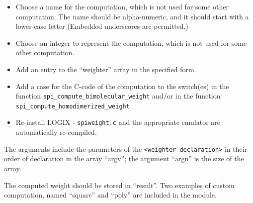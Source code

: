 \begin{itemize}
\item Choose a name for the computation, which is not used for some
other computation.  The name should be
alpha-numeric, and it should start with a lower-case letter (Embedded
underscores are permitted.)
\item Choose an integer to represent the computation, which is not used for
some other computation.
\item Add an entry to the ``weighter'' array in the specified form.
\item Add a case for the C-code of the computation to the switch(es)
in the function
\verb+spi_compute_bimolecular_weight+ and/or in the function
\verb+spi_compute_homodimerized_weight+ .
\item Re-install LOGIX - \verb+spiweight.c+ and the
appropriate emulator are automatically re-compiled.
\end{itemize}

\noindent
The arguments include the parameters of the
\verb+<weighter_declaration>+ in their order of declaration in
the array ``argv''; the argument ``argn'' is the size of the
array.

\noindent
The computed weight should be stored in ``result''.  Two
examples of custom computation, named ``square'' and ``poly''
are included in the module.

\newpage







